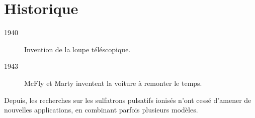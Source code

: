 \section{Historique}

\begin{description}
\item[1940] Invention de la loupe téléscopique.
\item[1943] McFly et Marty inventent la voiture à remonter le temps. 
\end{description}

Depuis, les recherches sur les sulfatrons pulsatifs ionisés n'ont cessé d'amener de nouvelles applications, en combinant parfois plusieurs modèles.


